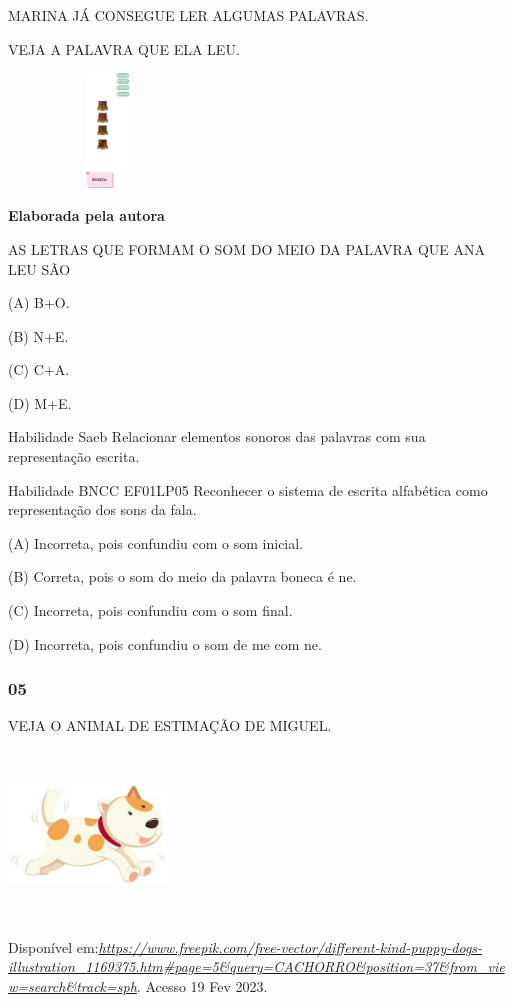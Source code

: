 MARINA JÁ CONSEGUE LER ALGUMAS PALAVRAS.

VEJA A PALAVRA QUE ELA LEU.

\includegraphics[width=2.07917in,height=1.19306in]{media/image213.png}

\textbf{Elaborada pela autora}

AS LETRAS QUE FORMAM O SOM DO MEIO DA PALAVRA QUE ANA LEU SÃO

(A) B+O.

(B) N+E.

(C) C+A.

(D) M+E.

Habilidade Saeb Relacionar elementos sonoros das palavras com sua
representação escrita.

Habilidade BNCC EF01LP05 Reconhecer o sistema de escrita alfabética como
representação dos sons da fala.

(A) Incorreta, pois confundiu com o som inicial.

(B) Correta, pois o som do meio da palavra boneca é ne.

(C) Incorreta, pois confundiu com o som final.

(D) Incorreta, pois confundiu o som de me com
ne.\protect\hypertarget{_heading=h.1meprgjlpdif}{}{}

\subsubsection{05}\label{section-45}

VEJA O ANIMAL DE ESTIMAÇÃO DE MIGUEL.

\includegraphics[width=1.65208in,height=1.75972in]{media/image214.jpg}

Disponível
em:\href{https://www.freepik.com/free-vector/different-kind-puppy-dogs-illustration_1169375.htm\#page=5\&query=CACHORRO\&position=37\&from_view=search\&track=sph}{\emph{https://www.freepik.com/free-vector/different-kind-puppy-dogs-illustration\_1169375.htm\#page=5\&query=CACHORRO\&position=37\&from\_view=search\&track=sph}}.
Acesso 19 Fev 2023.

